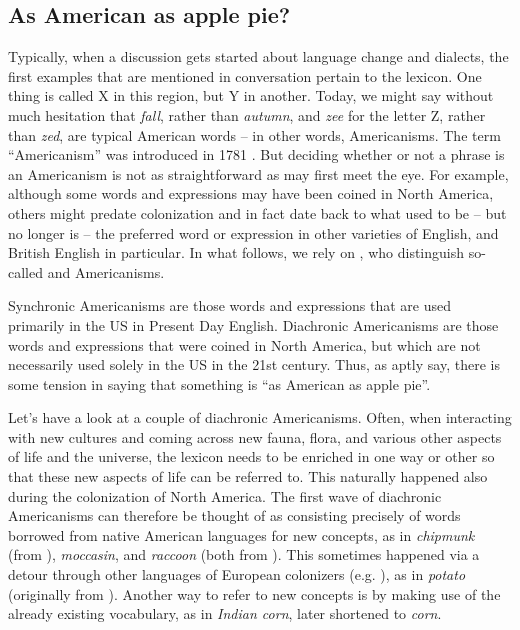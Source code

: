 \subsection{As American as apple pie?}
Typically, when a discussion gets started about language change and dialects, the first examples that are mentioned in conversation pertain to the lexicon. One thing is called X in this region, but Y in another. Today, we might say without much hesitation that \textit{fall}, rather than \textit{autumn}, and \textit{zee} for the letter Z, rather than \textit{zed}, are typical American words -- in other words, Americanisms. The term ``Americanism'' was introduced in 1781 \citep[68]{Fisher2001}. But deciding whether or not a phrase is an Americanism is not as straightforward as may first meet the eye. For example, although some words and expressions may have been coined in North America, others might predate colonization and in fact date back to what used to be -- but no longer is -- the preferred word or expression in other varieties of English, and British English in particular. In what follows, we rely on \citet{CassidyHall2001}, who distinguish so-called  and  Americanisms.

Synchronic Americanisms are those words and expressions that are used primarily in the US in Present Day English. Diachronic Americanisms are those words and expressions that were coined in North America, but which are not necessarily used solely in the US in the 21st century. Thus, as \citet{CassidyHall2001} aptly say, there is some tension in saying that something is ``as American as apple pie''.

Let's have a look at a couple of diachronic Americanisms. Often, when interacting with new cultures and coming across new fauna, flora, and various other aspects of life and the universe, the lexicon needs to be enriched in one way or other so that these new aspects of life can be referred to. This naturally happened also during the colonization of North America. The first wave of diachronic Americanisms can therefore be thought of as consisting precisely of words borrowed from native American languages for new concepts, as in \textit{chipmunk} (from ), \textit{moccasin}, and \textit{raccoon} (both from ). This sometimes happened via a detour through other languages of European colonizers (e.g. ), as in \textit{potato} (originally from ). Another way to refer to new concepts is by making use of the already existing vocabulary, as in \textit{Indian corn}, later shortened to \textit{corn}.

